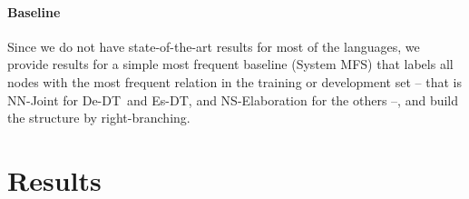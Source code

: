 \documentclass[11pt]{article}
\newcommand{\derst}{De-DT}
\newcommand{\esrst}{Es-DT}
\newcommand{\crel}[1]{{\sc #1}\xspace}
\begin{document}
\paragraph{Baseline}
Since we do not have state-of-the-art results for most of the languages, we provide results for a simple most frequent baseline (System MFS) that labels all nodes with the most frequent relation in the training or development set -- that is NN-\crel{Joint} for \derst\ and \esrst, and NS-\crel{Elaboration} for the others --, and build the structure by right-branching. 

\section{Results}
\label{sec:results}
\end{document}
